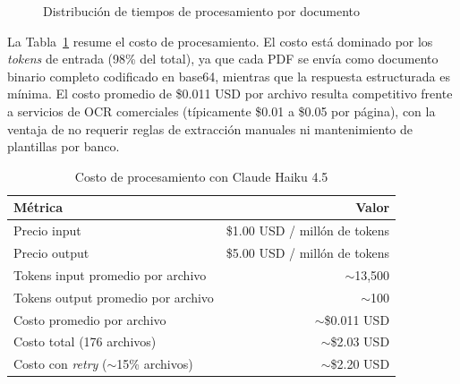 \begin{figure}[H]
    \centering
    \caption{Distribución de tiempos de procesamiento por documento}
    \label{fig:processing-time}
\end{figure}

La Tabla~\ref{tab:costos} resume el costo de procesamiento. El costo está dominado por los \textit{tokens} de entrada (98\% del total), ya que cada PDF se envía como documento binario completo codificado en base64, mientras que la respuesta estructurada es mínima. El costo promedio de \$0.011 USD por archivo resulta competitivo frente a servicios de OCR comerciales (típicamente \$0.01 a \$0.05 por página), con la ventaja de no requerir reglas de extracción manuales ni mantenimiento de plantillas por banco.

\begin{table}[H]
\centering
\vspace{6pt}
\begin{tabular}{lr}
\toprule
\textbf{Métrica} & \textbf{Valor} \\
\midrule
Precio input                          & \$1.00 USD / millón de tokens \\
Precio output                         & \$5.00 USD / millón de tokens \\
Tokens input promedio por archivo     & $\sim$13{,}500 \\
Tokens output promedio por archivo    & $\sim$100 \\
Costo promedio por archivo            & $\sim$\$0.011 USD \\
Costo total (176 archivos)            & $\sim$\$2.03 USD \\
Costo con \textit{retry} ($\sim$15\% archivos) & $\sim$\$2.20 USD \\
\bottomrule
\end{tabular}
\caption{Costo de procesamiento con Claude Haiku 4.5}
\label{tab:costos}
\end{table}

